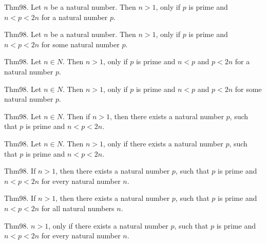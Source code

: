 \documentclass{article}
\begin{document}
Thm98. Let $n$ be a natural number. Then $n > 1$, only if $p$ is prime and $n < p < 2 n$ for a natural number $p$.

Thm98. Let $n$ be a natural number. Then $n > 1$, only if $p$ is prime and $n < p < 2 n$ for some natural number $p$.

Thm98. Let $n \in N$. Then $n > 1$, only if $p$ is prime and $n < p$ and $p < 2 n$ for a natural number $p$.

Thm98. Let $n \in N$. Then $n > 1$, only if $p$ is prime and $n < p$ and $p < 2 n$ for some natural number $p$.

Thm98. Let $n \in N$. Then if $n > 1$, then there exists a natural number $p$, such that $p$ is prime and $n < p < 2 n$.

Thm98. Let $n \in N$. Then $n > 1$, only if there exists a natural number $p$, such that $p$ is prime and $n < p < 2 n$.

Thm98. If $n > 1$, then there exists a natural number $p$, such that $p$ is prime and $n < p < 2 n$ for every natural number $n$.

Thm98. If $n > 1$, then there exists a natural number $p$, such that $p$ is prime and $n < p < 2 n$ for all natural numbers $n$.

Thm98. $n > 1$, only if there exists a natural number $p$, such that $p$ is prime and $n < p < 2 n$ for every natural number $n$.
\end{document}
